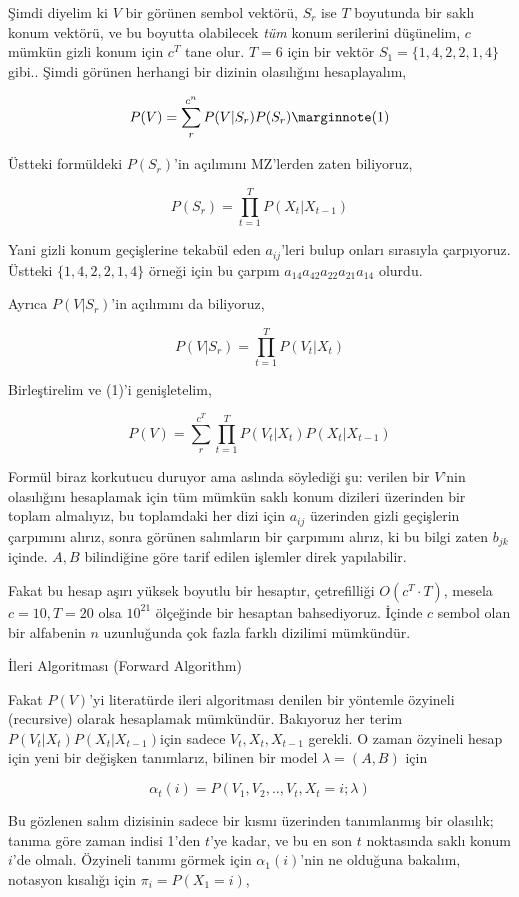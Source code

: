 \documentclass[12pt,fleqn]{article}\usepackage{../../common}
\begin{document}
Şimdi diyelim ki $V$ bir görünen sembol vektörü, $S_r$ ise $T$ boyutunda
bir saklı konum vektörü, ve bu boyutta olabilecek {\em tüm} konum
serilerini düşünelim, $c$ mümkün gizli konum için $c^T$ tane olur. $T=6$
için bir vektör $S_1 = \{1,4,2,2,1,4\}$ gibi.. Şimdi görünen herhangi bir
dizinin olasılığını hesaplayalım,

$$ P(V) = \sum_{r}^{c^n} P(V | S_r) P(S_r) 
\mlabel{1}
$$

Üstteki formüldeki $P(S_r)$'in açılımını MZ'lerden zaten biliyoruz, 

$$ P(S_r) = \prod_{t=1}^{T}P(X_t|X_{t-1}) $$

Yani gizli konum geçişlerine tekabül eden $a_{ij}$'leri bulup onları
sırasıyla çarpıyoruz. Üstteki $\{1,4,2,2,1,4\}$ örneği için bu
çarpım $a_{14}a_{42}a_{22}a_{21}a_{14}$ olurdu. 

Ayrıca $P(V|S_r)$'in açılımını da biliyoruz, 

$$ P(V|S_r) = \prod_{t=1}^{T} P(V_t | X_t) $$

Birleştirelim ve (1)'i genişletelim,

$$ 
P(V) = \sum_{r}^{c^T} \prod_{t=1}^{T} P(V_t | X_t)  P(X_t|X_{t-1}) 
$$

Formül biraz korkutucu duruyor ama aslında söylediği şu: verilen bir
$V$'nin olasılığını hesaplamak için tüm mümkün saklı konum dizileri
üzerinden bir toplam almalıyız, bu toplamdaki her dizi için $a_{ij}$
üzerinden gizli geçişlerin çarpımını alırız, sonra görünen salımların bir
çarpımını alırız, ki bu bilgi zaten $b_{jk}$ içinde. $A,B$ bilindiğine göre
tarif edilen işlemler direk yapılabilir.

Fakat bu hesap aşırı yüksek boyutlu bir hesaptır, çetrefilliği $O(c^T \cdot T)$, 
mesela $c=10,T=20$ olsa $10^{21}$ ölçeğinde bir hesaptan bahsediyoruz.
İçinde $c$ sembol olan bir alfabenin $n$ uzunluğunda çok fazla farklı dizilimi
mümkündür. 

İleri Algoritması (Forward Algorithm)

Fakat $P(V)$'yi literatürde ileri algoritması denilen bir yöntemle özyineli
(recursive) olarak hesaplamak mümkündür. Bakıyoruz her terim $P(V_t | X_t)
P(X_t|X_{t-1}) $için sadece $V_t,X_t,X_{t-1}$ gerekli. O zaman özyineli
hesap için  yeni bir  değişken tanımlarız, bilinen bir model 
$\lambda = (A,B)$ için

$$ \alpha_t(i) = P(V_1,V_2,..,V_t, X_t = i; \lambda) $$

Bu gözlenen salım dizisinin sadece bir kısmı üzerinden tanımlanmış bir olasılık;
tanıma göre zaman indisi 1'den $t$'ye kadar, ve bu en son $t$ noktasında saklı
konum $i$'de olmalı. Özyineli tanımı görmek için $\alpha_1(i)$'nin ne olduğuna
bakalım, notasyon kısalığı için $\pi_i = P(X_1 = i)$,
\end{document}
